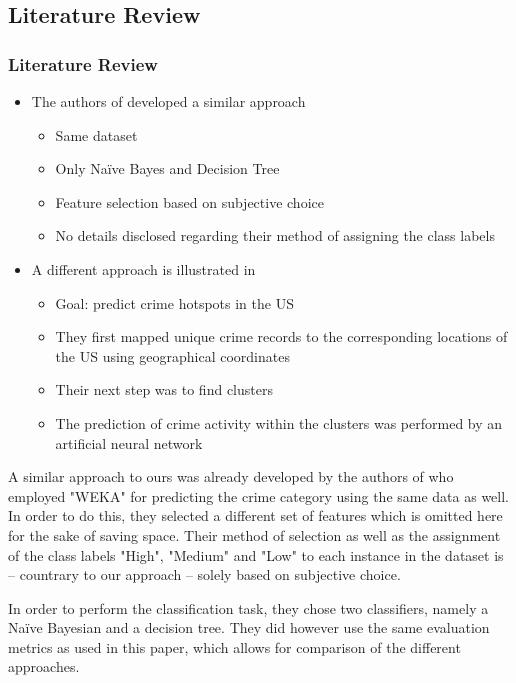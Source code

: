 \mode*
\begin{frame}
  \section{Literature Review}
  \frametitle{Literature Review}
  \begin{itemize}
    \item The authors of \cite{indian} developed a similar approach
      \begin{itemize}
        \item Same dataset
        \item Only Na\"ive Bayes and Decision Tree
        \item Feature selection based on subjective choice
        \item No details disclosed regarding their method of assigning the
          class labels
      \end{itemize}
    \item A different approach is illustrated in \cite{forecast}
      \begin{itemize}
        \item Goal: predict crime hotspots in the US
        \item They first mapped unique crime records to the
          corresponding locations of the US using geographical coordinates
        \item Their next step was to find clusters
        \item The prediction of crime activity within the clusters was
          performed by an artificial neural network
      \end{itemize}
  \end{itemize}
\end{frame}

A similar approach to ours was already developed by the authors of
\cite{indian} who employed "WEKA" for predicting the crime category
using the same data as well. In order to do this, they selected a
different set of features which is omitted here for the sake of saving
space. Their method of selection as well as the assignment of the
class labels "High", "Medium" and "Low" to each instance in the
dataset is -- countrary to our approach -- solely based on subjective
choice.

In order to perform the classification task, they chose two
classifiers, namely a Na\"ive Bayesian and a decision tree. They did
however use the same evaluation metrics as used in this paper, which
allows for comparison of the different approaches.\\


